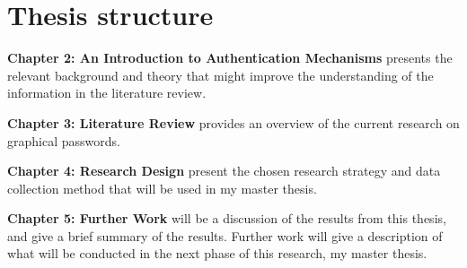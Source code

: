   \section{Thesis structure} \label{sec:structure}

    {\bf Chapter 2: An Introduction to Authentication Mechanisms} presents the relevant background and theory that might improve the understanding of the information in the literature review. 

    {\bf Chapter 3: Literature Review} provides an overview of the current research on graphical passwords. 

    {\bf Chapter 4: Research Design} present the chosen research strategy and data collection method that will be used in my master thesis. 

    {\bf Chapter 5: Further Work} will be a discussion of the results from this thesis, and give a brief summary of the results. Further work will give a description of what will be conducted in the next phase of this research, my master thesis.  





